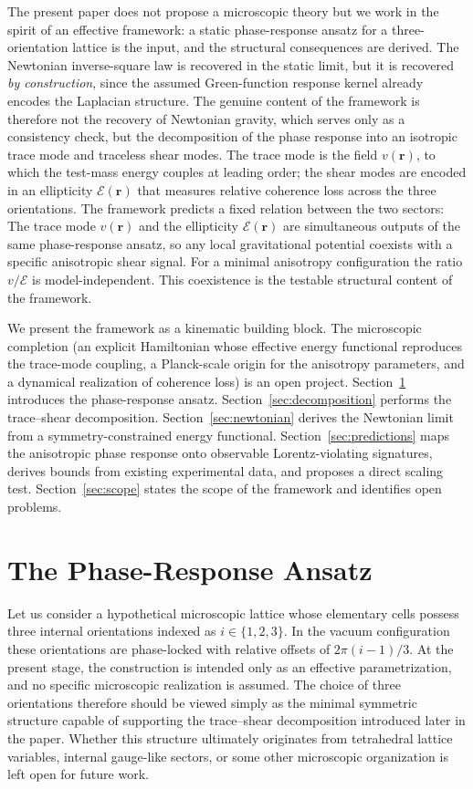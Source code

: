 \documentclass[pdflatex,sn-mathphys-num]{sn-jnl}%
\theoremstyle{thmstyleone}%
\theoremstyle{thmstyletwo}%
\theoremstyle{thmstylethree}%
\begin{document}
The present paper does not propose a microscopic theory but we
work in the spirit of an effective framework: a static
phase-response ansatz for a three-orientation lattice is the
input, and the structural consequences are derived. The
Newtonian inverse-square law is recovered in the static limit,
but it is recovered \emph{by construction}, since the assumed
Green-function response kernel already encodes the Laplacian
structure. The genuine content of the framework is therefore
not the recovery of Newtonian gravity, which serves only as a
consistency check, but the decomposition of the phase response
into an isotropic trace mode and traceless shear modes. The
trace mode is the field $v(\mathbf{r})$, to which the
test-mass energy couples at leading order; the shear modes are
encoded in an ellipticity $\mathcal{E}(\mathbf{r})$ that
measures relative coherence loss across the three
orientations. The framework predicts a fixed relation between the two
sectors: The trace mode $v(\mathbf{r})$ and the
ellipticity $\mathcal{E}(\mathbf{r})$ are simultaneous
outputs of the same phase-response ansatz, so any
local gravitational potential coexists with a specific
anisotropic shear signal. For a minimal anisotropy
configuration the ratio $v/\mathcal{E}$ is
model-independent. This coexistence is the testable
structural content of the framework.

We present the framework as a kinematic building block. The
microscopic completion (an explicit Hamiltonian whose effective
energy functional reproduces the trace-mode coupling, a
Planck-scale origin for the anisotropy parameters, and a
dynamical realization of coherence loss) is an open project.
Section~\ref{sec:ansatz} introduces the phase-response ansatz.
Section~\ref{sec:decomposition} performs the trace--shear
decomposition.
Section~\ref{sec:newtonian} derives the Newtonian limit from a
symmetry-constrained energy functional.
Section~\ref{sec:predictions} maps the anisotropic phase response 
onto observable Lorentz-violating signatures, derives bounds from 
existing experimental data, and proposes a direct scaling test.
Section~\ref{sec:scope} states the scope of the framework and
identifies open problems.


\section{The Phase-Response Ansatz}
\label{sec:ansatz}

Let us consider a hypothetical microscopic lattice whose elementary
cells possess three internal orientations indexed as
$i\in\{1,2,3\}$. In the vacuum configuration these orientations
are phase-locked with relative offsets of 
$2\pi(i-1)/3$. At the present stage, the construction is intended
only as an effective parametrization, and no specific
microscopic realization is assumed. The choice of three
orientations therefore should be viewed simply as the minimal
symmetric structure capable of supporting the trace--shear
decomposition introduced later in the paper. Whether this
structure ultimately originates from tetrahedral lattice
variables, internal gauge-like sectors, or some other microscopic
organization is left open for future work.
\end{document}
